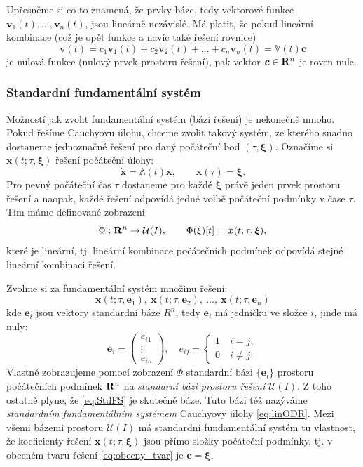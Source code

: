 \documentclass[a4paper, 12pt]{book}
\theoremstyle{definition}
\def\to{\rightarrow}
\def\Real{{\rm\bf R}}
\def\vc#1{\mathbf{\boldsymbol{#1}}}     %
\def\tn#1{{\mathbb{#1}}}    %
\def\df#1{\emph{#1}}
\begin{document}
Upřesněme si co to znamená, že prvky báze, tedy vektorové funkce $\vc v_1(t), \dots, \vc v_n(t)$, jsou lineárně nezávislé. Má platit, že pokud 
lineární kombinace (což je opět funkce a navíc také řešení rovnice) 
\[
  \vc v(t) = c_1 \vc v_1(t) + c_2 \vc v_2(t) + \dots + c_n\vc v_n(t) = \tn V(t) \vc c
\]
je nulová funkce (nulový prvek prostoru řešení), pak vektor $\vc c \in \Real^n$ je roven nule. 

\subsubsection{Standardní fundamentální systém}
Možností jak zvolit fundamentální systém (bázi řešení) je nekonečně mnoho. Pokud řešíme Cauchyovu úlohu, chceme zvolit takový systém,
ze kterého snadno dostaneme jednoznačné řešení pro daný počáteční bod $(\tau, \vc \xi)$. Označíme si
$ \vc x(t; \tau, \vc\xi) $ řešení počáteční úlohy:
\begin{equation}
    \label{eq:lin_Cauchy}
    \dot{\vc x}=\tn A(t)\vc x,\qquad \vc x(\tau)=\vc\xi.
\end{equation}
Pro pevný počáteční čas $\tau$ dostaneme pro každé $\vc\xi$ právě jeden prvek prostoru řešení a naopak, 
každé řešení odpovídá jedné volbě počáteční podmínky v čase $\tau$. Tím máme definované zobrazení
\[
   \Phi: \Real^n \to \mathcal{U}(I),\qquad \Phi(\xi)[t] = \vc x(t; \tau, \vc \xi),
\]
které je lineární, tj. lineární kombinace počátečních podmínek odpovídá stejné lineární kombinaci řešení.

Zvolme si za fundamentální systém  množinu řešení:
\begin{equation}
\label{eq:StdFS}
\vc x (t; \tau,\vc e_1),\  
\vc x (t; \tau,\vc e_2),\  
\dots,\ 
\vc x (t; \tau,\vc e_n)
\end{equation}
kde $\vc e_i$ jsou vektory standardní báze $R^n$, tedy
$\vc e_i$ má jedničku ve složce $i$, jinde má nuly:
\[
    \vc e_i = 
    \begin{pmatrix}
        e_{i1}\\ \vdots\\ e_{in}
    \end{pmatrix}
    ,\quad     
    e_{ij} = \left\{
        \begin{array}{l}
            1\quad i=j,\\
            0\quad i\ne j.
        \end{array}
        \right.
\]
Vlastně zobrazujeme pomocí zobrazení $\Phi$ standardní bázi $\{\vc e_i\}$ prostoru počátečních podmínek $\Real^n$ na \df{standarní bázi prostoru řešení} 
$\mathcal{U}(I)$. Z toho ostatně plyne, že \eqref{eq:StdFS} je skutečně báze. Tuto bázi též nazýváme \df{standardním fundamentálním 
systémem} Cauchyovy úlohy \eqref{eq:linODR}. Mezi všemi bázemi prostoru $\mathcal U(I)$ má standardní fundamentální systém tu vlastnost, že koeficienty 
řešení $\vc x(t; \tau,\vc  \xi)$ jsou přímo složky počáteční podmínky, tj. v obecném tvaru řešení \eqref{eq:obecny_tvar} je $\vc c = \vc\xi$.
\end{document}
